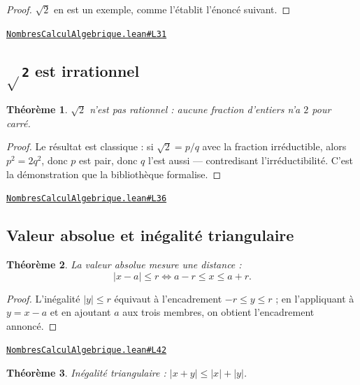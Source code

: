 \documentclass[11pt,a4paper]{article}
\theoremstyle{definition}
\theoremstyle{plain}
\newtheorem{theoreme}{Théorème}
\newcommand{\source}[2]{\par\smallskip\noindent\hfill{\footnotesize\href{#1}{\texttt{#2}}}\par\smallskip}
\begin{document}
\begin{proof}
$\sqrt2$ en est un exemple, comme l'établit l'énoncé suivant.
\end{proof}
\source{https://github.com/Commutator-IO/learn-lean/blob/main/cours/02-lycee/01-nombres-calcul-algebrique/NombresCalculAlgebrique.lean\#L31}{NombresCalculAlgebrique.lean\#L31}

\subsection{\texttt{\(\sqrt{}\)2} est irrationnel}

\begin{theoreme}
$\sqrt2$ n'est pas rationnel : aucune fraction d'entiers n'a $2$ pour carré.
\end{theoreme}

\begin{proof}
Le résultat est classique : si $\sqrt2 = p/q$ avec la fraction irréductible, alors
$p^2 = 2q^2$, donc $p$ est pair, donc $q$ l'est aussi — contredisant l'irréductibilité.
C'est la démonstration que la bibliothèque formalise.
\end{proof}
\source{https://github.com/Commutator-IO/learn-lean/blob/main/cours/02-lycee/01-nombres-calcul-algebrique/NombresCalculAlgebrique.lean\#L36}{NombresCalculAlgebrique.lean\#L36}

\subsection{Valeur absolue et inégalité triangulaire}

\begin{theoreme}
La valeur absolue mesure une distance :
\[ |x - a| \le r \iff a - r \le x \le a + r . \]
\end{theoreme}

\begin{proof}
L'inégalité $|y| \le r$ équivaut à l'encadrement $-r \le y \le r$ ; en l'appliquant à
$y = x - a$ et en ajoutant $a$ aux trois membres, on obtient l'encadrement annoncé.
\end{proof}
\source{https://github.com/Commutator-IO/learn-lean/blob/main/cours/02-lycee/01-nombres-calcul-algebrique/NombresCalculAlgebrique.lean\#L42}{NombresCalculAlgebrique.lean\#L42}

\begin{theoreme}
Inégalité triangulaire : $|x + y| \le |x| + |y|$.
\end{theoreme}
\end{document}
